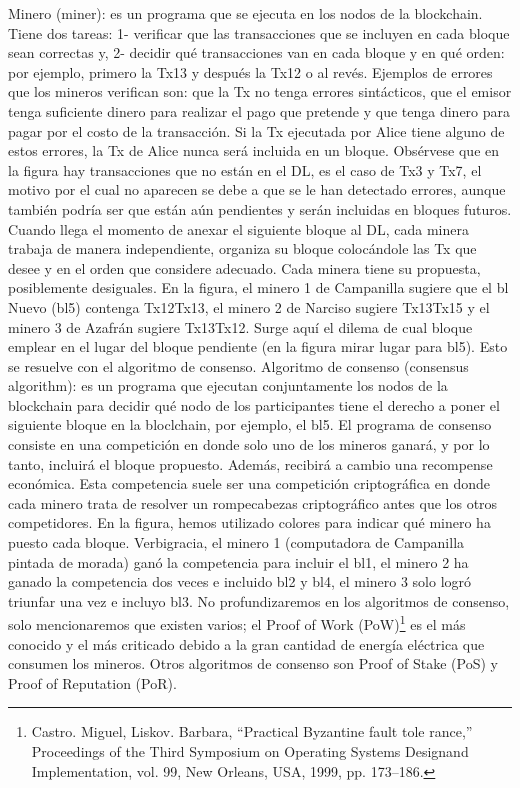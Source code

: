 \documentclass[12pt]{report} %
\begin{document}
	Minero (miner): es un programa que se ejecuta en los nodos de la blockchain. Tiene dos tareas: 1- verificar que las transacciones que se incluyen en cada bloque sean correctas y, 2- decidir qué transacciones van en cada bloque y en qué orden: por ejemplo, primero la Tx13 y después la Tx12 o al revés. Ejemplos de errores que los mineros verifican son:  que la Tx no tenga errores sintácticos, que el emisor tenga suficiente dinero para realizar el pago que pretende y que tenga dinero para pagar por el costo de la transacción. Si la Tx ejecutada por Alice tiene alguno de estos errores, la Tx de Alice nunca será incluida en un bloque. Obsérvese que en la figura hay transacciones que no están en el DL, es el caso de Tx3 y Tx7, el motivo por el cual no aparecen se debe a que se le han detectado  errores, aunque también podría ser que están aún pendientes y serán incluidas en bloques futuros.
	Cuando llega el momento de anexar el siguiente bloque al DL, cada minera trabaja de manera independiente, organiza su bloque colocándole las Tx que desee y en el orden que considere adecuado. Cada minera tiene su propuesta, posiblemente desiguales.  En la figura, el minero 1 de Campanilla sugiere que el bl Nuevo (bl5) contenga Tx12Tx13, el minero 2 de Narciso sugiere Tx13Tx15 y el minero 3 de Azafrán sugiere Tx13Tx12. Surge aquí el dilema de cual bloque emplear en el lugar del bloque pendiente (en la figura mirar lugar para bl5).  Esto se resuelve con el algoritmo de consenso.
	Algoritmo de consenso (consensus algorithm): es un programa que ejecutan conjuntamente los nodos de la blockchain para decidir qué nodo de los participantes tiene el derecho a poner el siguiente bloque en la bloclchain, por ejemplo, el bl5.  El programa de consenso consiste en una competición en donde solo uno de los mineros ganará, y por lo tanto, incluirá el bloque propuesto. Además, recibirá a cambio una recompense económica.  Esta competencia suele ser una competición criptográfica en donde cada minero trata de resolver un rompecabezas criptográfico antes que los otros competidores. 
	En la figura, hemos utilizado colores para indicar qué minero ha puesto cada bloque. Verbigracia, el minero 1 (computadora de Campanilla pintada de morada) ganó la competencia para incluir el bl1, el minero 2 ha ganado la competencia dos veces e incluido bl2 y bl4, el minero 3 solo logró triunfar una vez e incluyo bl3. 
	No profundizaremos en los algoritmos de consenso, solo mencionaremos que existen varios; el Proof of Work (PoW)\footnote{  Castro. Miguel, Liskov. Barbara, “Practical Byzantine fault tole rance,” Proceedings of the Third Symposium on Operating Systems Designand Implementation, vol. 99, New Orleans, USA, 1999, pp. 173–186.} es el más conocido y el más criticado debido a la gran cantidad de energía eléctrica que consumen los mineros. Otros algoritmos de consenso son Proof of Stake (PoS) y Proof of Reputation (PoR).
\end{document}
